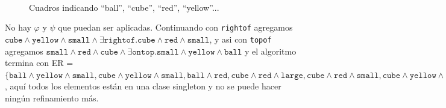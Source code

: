 \begin{figure}[ht]
\begin{center}
\\[0pt]
\caption{Cuadros indicando ``ball'', ``cube'', ``red'', ``yellow''...}
\label{fig-modelo15}
\end{center}
\end{figure}


No hay
$\varphi$ y $\psi$ que puedan ser aplicadas. Continuando con \texttt{rightof} agregamos $\texttt{cube} \wedge \texttt{yellow} \wedge \texttt{small} \wedge \exists \texttt{rightof}. \texttt{cube} \wedge \texttt{red} \wedge \texttt{small}$, y asi con \texttt{topof} agregamos $\texttt{small} \wedge \texttt{red} \wedge \texttt{cube} \wedge \exists \texttt{ontop}. \texttt{small} \wedge \texttt{yellow} \wedge \texttt{ball}$ y el algoritmo termina con ER = $\{\texttt{ball} \wedge \texttt{yellow} \wedge \texttt{small}, \texttt{cube} \wedge \texttt{yellow} \wedge \texttt{small}, \texttt{ball} \wedge \texttt{red}, \texttt{cube} \wedge \texttt{red} \wedge \texttt{large}, \texttt{cube} \wedge \texttt{red} \wedge \texttt{small}, \texttt{cube} \wedge \texttt{yellow} \wedge \texttt{small} \wedge \exists \texttt{rightof}. \texttt{cube} \wedge \texttt{red} \wedge \texttt{small}, \texttt{small} \wedge \texttt{red} \wedge \texttt{cube} \wedge \exists \texttt{ontop}. \texttt{small} \wedge \texttt{yellow} \wedge \texttt{ball}\}$, 
aqu\'i todos los elementos est\'an en una clase singleton y no se puede hacer ning\'un refinamiento m\'as. 

